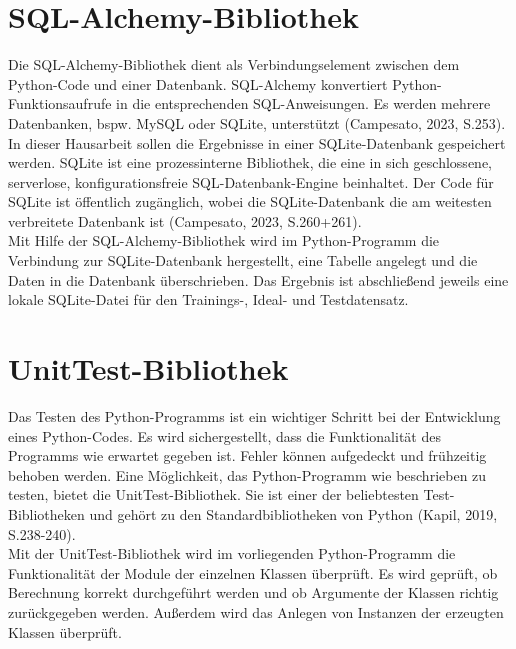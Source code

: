 \documentclass[11pt,a4paper]{scrreprt}
\begin{document}
\section{SQL-Alchemy-Bibliothek}
\label{sec:SQL}
Die SQL-Alchemy-Bibliothek dient als Verbindungselement zwischen dem Python-Code und einer Datenbank. SQL-Alchemy konvertiert Python-Funktionsaufrufe in die entsprechenden SQL-Anweisungen. Es werden mehrere Datenbanken, bspw. MySQL oder SQLite, unterstützt (Campesato, 2023, S.253).\\
In dieser Hausarbeit sollen die Ergebnisse in einer SQLite-Datenbank gespeichert werden. SQLite ist eine prozessinterne Bibliothek, die eine in sich geschlossene, serverlose, konfigurationsfreie SQL-Datenbank-Engine beinhaltet. Der Code für SQLite ist öffentlich zugänglich, wobei die SQLite-Datenbank die am weitesten verbreitete Datenbank ist (Campesato, 2023, S.260+261).\\
Mit Hilfe der SQL-Alchemy-Bibliothek wird im Python-Programm die Verbindung zur SQLite-Datenbank hergestellt, eine Tabelle angelegt und die Daten in die Datenbank überschrieben. Das Ergebnis ist abschließend jeweils eine lokale SQLite-Datei für den Trainings-, Ideal- und Testdatensatz.

\section{UnitTest-Bibliothek}
\label{sec:UnitTest}
Das Testen des Python-Programms ist ein wichtiger Schritt bei der Entwicklung eines Python-Codes. Es wird sichergestellt, dass die Funktionalität des Programms wie erwartet gegeben ist. Fehler können aufgedeckt und frühzeitig behoben werden. Eine Möglichkeit, das Python-Programm wie beschrieben zu testen, bietet die UnitTest-Bibliothek. Sie ist einer der beliebtesten Test-Bibliotheken und gehört zu den Standardbibliotheken von Python (Kapil, 2019, S.238-240). \\
Mit der UnitTest-Bibliothek wird im vorliegenden Python-Programm die Funktionalität der Module der einzelnen Klassen überprüft. Es wird geprüft, ob Berechnung korrekt durchgeführt werden und ob Argumente der Klassen richtig zurückgegeben werden. Außerdem wird das Anlegen von Instanzen der erzeugten Klassen überprüft.  
\end{document}
